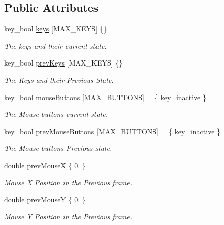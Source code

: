 \subsection*{Public Attributes}
\begin{DoxyCompactItemize}
\item 
key\+\_\+bool \mbox{\hyperlink{group___getters_ga7e9389c2d0e9f90f10422f86be7d22d8}{keys}} \mbox{[}M\+A\+X\+\_\+\+K\+E\+YS\mbox{]} \{\}
\begin{DoxyCompactList}\small\item\em The keys and their current state. \end{DoxyCompactList}\item 
key\+\_\+bool \mbox{\hyperlink{group___getters_gaa0adc9c4e183ccaa355928059359fe9a}{prev\+Keys}} \mbox{[}M\+A\+X\+\_\+\+K\+E\+YS\mbox{]} \{\}
\begin{DoxyCompactList}\small\item\em The Keys and their Previous State. \end{DoxyCompactList}\item 
key\+\_\+bool \mbox{\hyperlink{group___getters_gaf219ad727d87f6f2d0d34c0d165ec065}{mouse\+Buttons}} \mbox{[}M\+A\+X\+\_\+\+B\+U\+T\+T\+O\+NS\mbox{]} = \{ key\+\_\+inactive \}
\begin{DoxyCompactList}\small\item\em The Mouse buttons current state. \end{DoxyCompactList}\item 
key\+\_\+bool \mbox{\hyperlink{group___getters_ga89e8b6c9ffa84a095ec76cf1b29b5f94}{prev\+Mouse\+Buttons}} \mbox{[}M\+A\+X\+\_\+\+B\+U\+T\+T\+O\+NS\mbox{]} = \{ key\+\_\+inactive \}
\begin{DoxyCompactList}\small\item\em The Mouse buttons Previous state. \end{DoxyCompactList}\item 
double \mbox{\hyperlink{group___getters_gad50401a5c3c350b562b9577106e60fb0}{prev\+MouseX}} \{ 0. \}
\begin{DoxyCompactList}\small\item\em Mouse X Position in the Previous frame. \end{DoxyCompactList}\item 
double \mbox{\hyperlink{group___getters_gaf4a58a8da45b8aeeb36dbcae237bcef4}{prev\+MouseY}} \{ 0. \}
\begin{DoxyCompactList}\small\item\em Mouse Y Position in the Previous frame. \end{DoxyCompactList}\item 

\end{DoxyCompactItemize}
